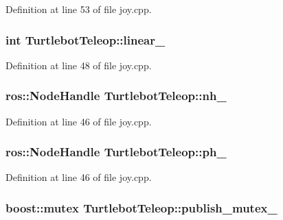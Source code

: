 \-Definition at line 53 of file joy.\-cpp.

\subsubsection[{linear\-\_\-}]{\setlength{\rightskip}{0pt plus 5cm}int {\bf \-Turtlebot\-Teleop\-::linear\-\_\-}\hspace{0.3cm}{\ttfamily  [private]}}\label{classTurtlebotTeleop_a149ff3966ce0cafd27a9610e247de19e}


\-Definition at line 48 of file joy.\-cpp.

\subsubsection[{nh\-\_\-}]{\setlength{\rightskip}{0pt plus 5cm}ros\-::\-Node\-Handle {\bf \-Turtlebot\-Teleop\-::nh\-\_\-}\hspace{0.3cm}{\ttfamily  [private]}}\label{classTurtlebotTeleop_aa25e6e15a9d9a5d3b5eb135e11a888eb}


\-Definition at line 46 of file joy.\-cpp.

\subsubsection[{ph\-\_\-}]{\setlength{\rightskip}{0pt plus 5cm}ros\-::\-Node\-Handle {\bf \-Turtlebot\-Teleop\-::ph\-\_\-}\hspace{0.3cm}{\ttfamily  [private]}}\label{classTurtlebotTeleop_a966ac7baf800aa218607c7449087c16e}


\-Definition at line 46 of file joy.\-cpp.

\subsubsection[{publish\-\_\-mutex\-\_\-}]{\setlength{\rightskip}{0pt plus 5cm}boost\-::mutex {\bf \-Turtlebot\-Teleop\-::publish\-\_\-mutex\-\_\-}\hspace{0.3cm}{\ttfamily  [private]}}\label{classTurtlebotTeleop_aa9d3796c5ad60a96824ac351906ef0aa}


